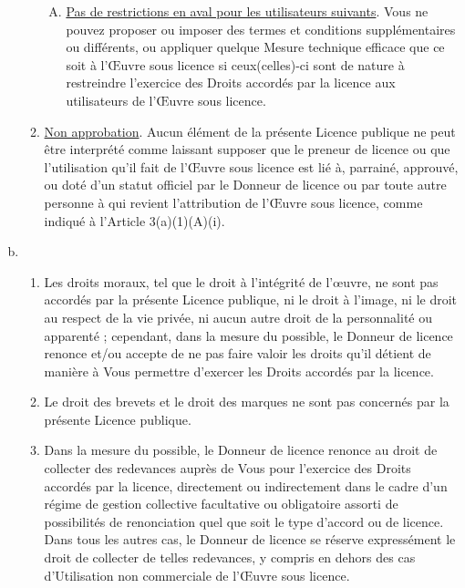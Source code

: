 \begin{enumerate}[a.]
\begin{enumerate}[1.]
\begin{enumerate}[A.]
\item \uline{Pas de restrictions en aval pour les utilisateurs suivants}. Vous ne pouvez proposer ou imposer des termes et conditions supplémentaires ou différents, ou appliquer quelque Mesure technique efficace que ce soit à l’Œuvre sous licence si ceux(celles)-ci sont de nature à restreindre l’exercice des Droits accordés par la licence aux utilisateurs de l’Œuvre sous licence.
\end{enumerate}
\item \uline{Non approbation}. Aucun élément de la présente Licence publique ne peut être interprété comme laissant supposer que le preneur de licence ou que l’utilisation qu’il fait de l’Œuvre sous licence est lié à, parrainé, approuvé, ou doté d'un statut officiel par le Donneur de licence ou par toute autre personne à qui revient l’attribution de l’Œuvre sous licence, comme indiqué à l’Article 3(a)(1)(A)(i).
\end{enumerate}
\item {}
\begin{enumerate}[1.]
\item Les droits moraux, tel que le droit à l’intégrité de l’œuvre, ne sont pas accordés par la présente Licence publique, ni le droit à l’image, ni le droit au respect de la vie privée, ni aucun autre droit de la personnalité ou apparenté ; cependant, dans la mesure du possible, le Donneur de licence renonce et/ou accepte de ne pas faire valoir les droits qu’il détient de manière à Vous permettre d’exercer les Droits accordés par la licence.
\item Le droit des brevets et le droit des marques ne sont pas concernés par la présente Licence publique.
\item Dans la mesure du possible, le Donneur de licence renonce au droit de collecter des redevances auprès de Vous pour l’exercice des Droits accordés par la licence, directement ou indirectement dans le cadre d’un régime de gestion collective facultative ou obligatoire assorti de possibilités de renonciation quel que soit le type d’accord ou de licence. Dans tous les autres cas, le Donneur de licence se réserve expressément le droit de collecter de telles redevances, y compris en dehors des cas d'Utilisation non commerciale de l’Œuvre sous licence.
\end{enumerate}
\end{enumerate}



